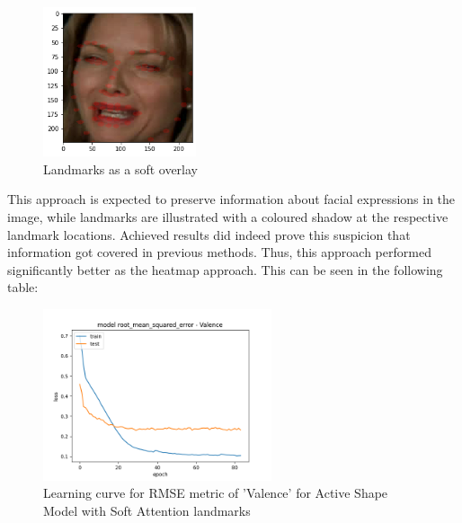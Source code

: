 \begin{figure}[H]
  \begin{center}
  \includegraphics[angle=0, width=0.4\textwidth]{Figures/landmarks_as_softOverlay.png}
  \caption{Landmarks as a soft overlay}
  \label{fig:LandmarksSoftOverlay}
  \end{center}
\end{figure}

This approach is expected to preserve information about facial expressions in the image, while landmarks are illustrated with a coloured shadow at the respective landmark locations. Achieved results did indeed prove this suspicion that information got covered in previous methods. Thus, this approach performed significantly better as the heatmap approach. This can be seen in the following table:

\begin{figure}[H]
  \begin{center}
  \includegraphics[angle=0, width=0.6\textwidth]{Figures/rmse_out1_softAttention.png}
  \caption{Learning curve for RMSE metric of 'Valence' for Active Shape Model with Soft Attention landmarks}
  \label{fig:LandmarksSoftAttention}
  \end{center}
\end{figure}

